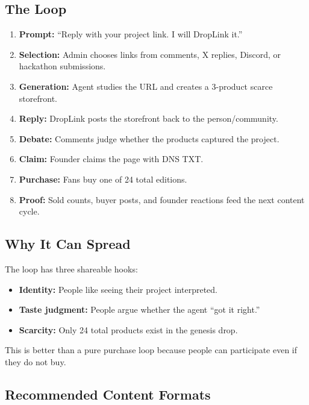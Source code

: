 \documentclass[11pt]{article}
\begin{document}
\subsection{The Loop}

\begin{enumerate}
  \item \textbf{Prompt:} ``Reply with your project link. I will DropLink it.''
  \item \textbf{Selection:} Admin chooses links from comments, X replies, Discord, or hackathon submissions.
  \item \textbf{Generation:} Agent studies the URL and creates a 3-product scarce storefront.
  \item \textbf{Reply:} DropLink posts the storefront back to the person/community.
  \item \textbf{Debate:} Comments judge whether the products captured the project.
  \item \textbf{Claim:} Founder claims the page with DNS TXT.
  \item \textbf{Purchase:} Fans buy one of 24 total editions.
  \item \textbf{Proof:} Sold counts, buyer posts, and founder reactions feed the next content cycle.
\end{enumerate}

\subsection{Why It Can Spread}

The loop has three shareable hooks:

\begin{itemize}
  \item \textbf{Identity:} People like seeing their project interpreted.
  \item \textbf{Taste judgment:} People argue whether the agent ``got it right.''
  \item \textbf{Scarcity:} Only 24 total products exist in the genesis drop.
\end{itemize}

This is better than a pure purchase loop because people can participate even if they do not buy.

\subsection{Recommended Content Formats}
\end{document}

